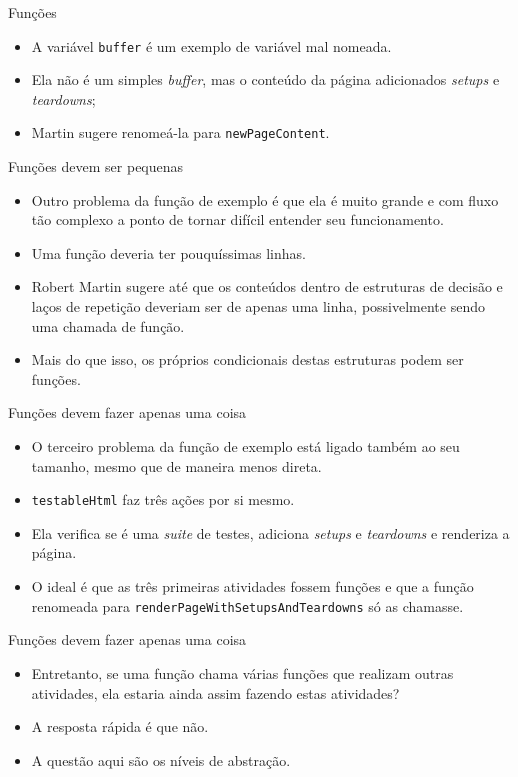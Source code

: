 \documentclass[11pt]{beamer}
\begin{document}
  \begin{frame}[fragile]{Funções}
    \begin{itemize}
      \item A variável \verb|buffer| é um exemplo de variável mal nomeada.
      \item Ela não é um simples \textit{buffer}, mas o conteúdo da página adicionados \textit{setups} e \textit{teardowns};
      \item Martin sugere renomeá-la para \verb|newPageContent|.
    \end{itemize}
  \end{frame}

  \begin{frame}[fragile]{Funções devem ser pequenas}
    \begin{itemize}
      \item Outro problema da função de exemplo é que ela é muito grande e com fluxo tão complexo a ponto de tornar difícil entender seu funcionamento.
      \item Uma função deveria ter pouquíssimas linhas.
      \item Robert Martin sugere até que os conteúdos dentro de estruturas de decisão e laços de repetição deveriam ser de apenas uma linha, possivelmente sendo uma chamada de função.
      \item Mais do que isso, os próprios condicionais destas estruturas podem ser funções.  
    \end{itemize}
  \end{frame}

  \begin{frame}[fragile]{Funções devem fazer apenas uma coisa}
    \begin{itemize}
      \item O terceiro problema da função de exemplo está ligado também ao seu tamanho, mesmo que de maneira menos direta.
      \item \verb|testableHtml| faz três ações por si mesmo.
      \item Ela verifica se é uma \textit{suite} de testes, adiciona \textit{setups} e \textit{teardowns} e renderiza a página.
      \item O ideal é que as três primeiras atividades fossem funções e que a função renomeada para \verb|renderPageWithSetupsAndTeardowns| só as chamasse.
    \end{itemize}
  \end{frame}

  \begin{frame}[fragile]{Funções devem fazer apenas uma coisa}
    \begin{itemize}
      \item Entretanto, se uma função chama várias funções que realizam outras atividades, ela estaria ainda assim fazendo estas atividades?
      \item A resposta rápida é que não.
      \item A questão aqui são os níveis de abstração.
    \end{itemize}
  \end{frame}
\end{document}
